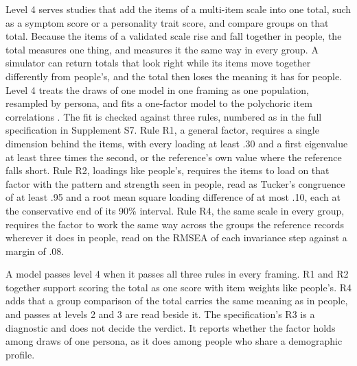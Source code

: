Level 4 serves studies that add the items of a multi-item scale into one total, such as a symptom score or a personality trait score, and compare groups on that total.
Because the items of a validated scale rise and fall together in people, the total measures one thing, and measures it the same way in every group.
A simulator can return totals that look right while its items move together differently from people's, and the total then loses the meaning it has for people.
Level 4 treats the draws of one model in one framing as one population, resampled by persona, and fits a one-factor model to the polychoric item correlations \citep{olsson1979polychoric}.
The fit is checked against three rules, numbered as in the full specification in Supplement S7.
Rule R1, a general factor, requires a single dimension behind the items, with every loading at least .30 and a first eigenvalue at least three times the second, or the reference's own value where the reference falls short.
Rule R2, loadings like people's, requires the items to load on that factor with the pattern and strength seen in people, read as Tucker's congruence of at least .95 \citep{lorenzoseva2006congruence} and a root mean square loading difference of at most .10, each at the conservative end of its 90\% interval.
Rule R4, the same scale in every group, requires the factor to work the same way across the groups the reference records wherever it does in people, read on the RMSEA of each invariance step \citep{savalei2024rmsea} against a margin of .08.

A model passes level 4 when it passes all three rules in every framing.
R1 and R2 together support scoring the total as one score with item weights like people's.
R4 adds that a group comparison of the total carries the same meaning as in people, and passes at levels 2 and 3 are read beside it.
The specification's R3 is a diagnostic and does not decide the verdict.
It reports whether the factor holds among draws of one persona, as it does among people who share a demographic profile.
